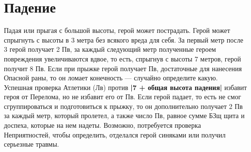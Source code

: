 \section{Падение}
Падая или прыгая с большой высоты, герой может пострадать. Герой может спрыгнуть с высоты в 3 метра без всякого вреда для себя. За первый метр после 3 герой получает 2 Пв, за каждый следующий метр полученные героем повреждения увеличиваются вдвое, то есть, спрыгнув с высоты 7 метров, герой получит 8 Пв. Если при прыжке герой получает Пв, достаточные для нанесения Опасной раны, то он ломает конечность — случайно определите какую. Успешная проверка Атлетики (Лв) против \textbf{|7 + общая высота падения|} избавит героя от Перелома, но не избавит его от Пв.
\newline
Если герой падает, то есть не смог сгруппироваться и подготовиться к прыжку, то он дополнительно получает 2 Пв за каждый метр, который пролетел, а также число Пв, равное сумме БЗщ щита и доспеха, которые на нем надеты. Возможно, потребуется проверка Неприятностей, чтобы определить, отделался герой синяками или получил серьезные травмы.
